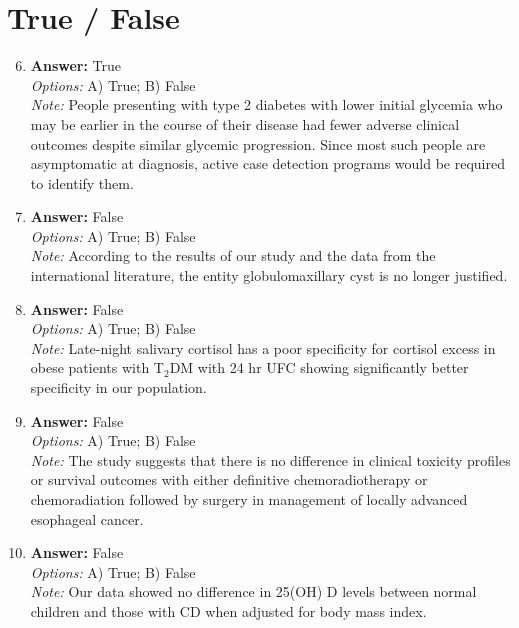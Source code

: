 \documentclass[12pt]{article}
\begin{document}
\section*{True / False}
\begin{enumerate}[label=\arabic*.]
\setcounter{enumi}{5}
\item \textbf{Answer:} True
\\ \textit{Options:} A) True; B) False
\\ \textit{Note:} People presenting with type 2 diabetes with lower initial glycemia who may be earlier in the course of their disease had fewer adverse clinical outcomes despite similar glycemic progression. Since most such people are asymptomatic at diagnosis, active case detection programs would be required to identify them.
\item \textbf{Answer:} False
\\ \textit{Options:} A) True; B) False
\\ \textit{Note:} According to the results of our study and the data from the international literature, the entity globulomaxillary cyst is no longer justified.
\item \textbf{Answer:} False
\\ \textit{Options:} A) True; B) False
\\ \textit{Note:} Late-night salivary cortisol has a poor specificity for cortisol excess in obese patients with T$_{2}$DM with 24 hr UFC showing significantly better specificity in our population.
\item \textbf{Answer:} False
\\ \textit{Options:} A) True; B) False
\\ \textit{Note:} The study suggests that there is no difference in clinical toxicity profiles or survival outcomes with either definitive chemoradiotherapy or chemoradiation followed by surgery in management of locally advanced esophageal cancer.
\item \textbf{Answer:} False
\\ \textit{Options:} A) True; B) False
\\ \textit{Note:} Our data showed no difference in 25(OH) D levels between normal children and those with CD when adjusted for body mass index.
\end{enumerate}
\end{document}
